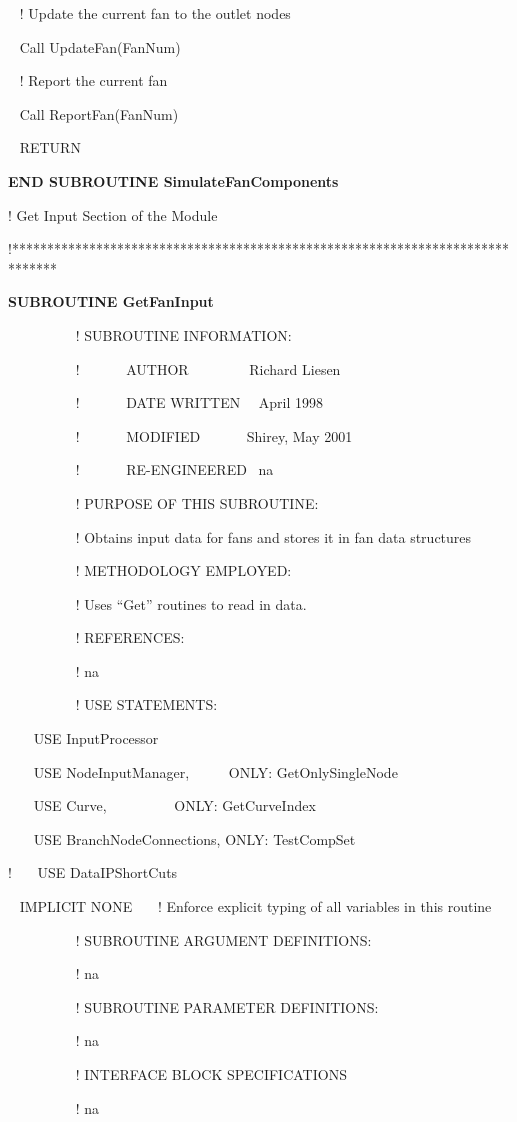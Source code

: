 ~ ! Update the current fan to the outlet nodes

~ Call UpdateFan(FanNum)

~ ! Report the current fan

~ Call ReportFan(FanNum)

~ RETURN

\textbf{END SUBROUTINE SimulateFanComponents}

! Get Input Section of the Module

!******************************************************************************

\textbf{SUBROUTINE GetFanInput}

~~~~~~~~~ ! SUBROUTINE INFORMATION:

~~~~~~~~~ !~~~~~~ AUTHOR~~~~~~~~ Richard Liesen

~~~~~~~~~ !~~~~~~ DATE WRITTEN~~ April 1998

~~~~~~~~~ !~~~~~~ MODIFIED~~~~~~ Shirey, May 2001

~~~~~~~~~ !~~~~~~ RE-ENGINEERED~ na

~~~~~~~~~ ! PURPOSE OF THIS SUBROUTINE:

~~~~~~~~~ ! Obtains input data for fans and stores it in fan data structures

~~~~~~~~~ ! METHODOLOGY EMPLOYED:

~~~~~~~~~ ! Uses ``Get'' routines to read in data.

~~~~~~~~~ ! REFERENCES:

~~~~~~~~~ ! na

~~~~~~~~~ ! USE STATEMENTS:

~~~ USE InputProcessor

~~~ USE NodeInputManager,~~~~~ ONLY: GetOnlySingleNode

~~~ USE Curve,~~~~~~~~~ ONLY: GetCurveIndex

~~~ USE BranchNodeConnections, ONLY: TestCompSet

!~~~ USE DataIPShortCuts

~ IMPLICIT NONE~~~ ! Enforce explicit typing of all variables in this routine

~~~~~~~~~ ! SUBROUTINE ARGUMENT DEFINITIONS:

~~~~~~~~~ ! na

~~~~~~~~~ ! SUBROUTINE PARAMETER DEFINITIONS:

~~~~~~~~~ ! na

~~~~~~~~~ ! INTERFACE BLOCK SPECIFICATIONS

~~~~~~~~~ ! na

